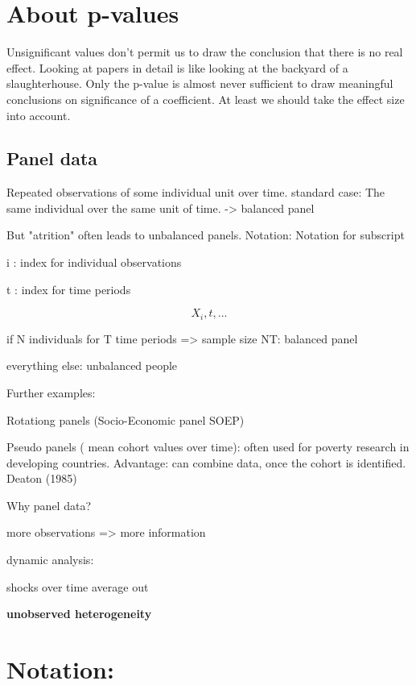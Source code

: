 \documentclass{article}
\begin{document}


\section{About p-values}
Unsignificant values don't permit us to draw the conclusion that there is no real effect.
Looking at papers in detail is like looking at the backyard of a slaughterhouse.
Only the p-value is almost never sufficient to draw meaningful conclusions on significance of a coefficient. At least we should take the effect size into account.

\subsection{Panel data}

Repeated observations of some individual unit over time.
standard case: The same individual over the same unit of time. -> balanced panel

But "atrition" often leads to unbalanced panels. 
Notation: Notation for subscript

i : index for individual observations

t : index for time periods



\[ X_i,t , ... \]

if N individuals for T time periods => sample size
NT: balanced panel

everything else: unbalanced people

Further examples:

Rotationg panels (Socio-Economic panel SOEP)

Pseudo panels ( mean cohort values over time): often used for poverty research in developing countries. Advantage: can combine data, once the cohort is identified. Deaton (1985)

Why panel data?
\begin{itemize}
\item{ more observations => more information}
\item{dynamic analysis: \item{shocks over time average out}}
\item{ \textbf{unobserved heterogeneity}}
\end{itemize}
\section{Notation:}
\end{document}
